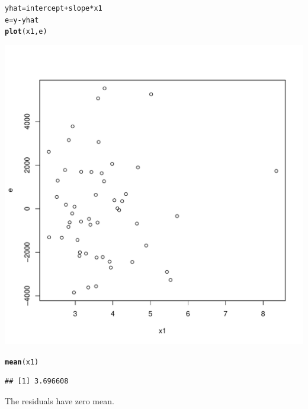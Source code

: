 \documentclass{article}\usepackage[]{graphicx}\usepackage[]{color}
\makeatletter
\def\maxwidth{ %
  \ifdim\Gin@nat@width>\linewidth
    \linewidth
  \else
    \Gin@nat@width
  \fi
}
\newcommand{\hlopt}[1]{\textcolor[rgb]{0,0,0}{#1}}%
\newcommand{\hlstd}[1]{\textcolor[rgb]{0.345,0.345,0.345}{#1}}%
\newcommand{\hlkwb}[1]{\textcolor[rgb]{0.69,0.353,0.396}{#1}}%
\newcommand{\hlkwd}[1]{\textcolor[rgb]{0.737,0.353,0.396}{\textbf{#1}}}%
\newenvironment{kframe}{%
 \def\at@end@of@kframe{}%
 \ifinner\ifhmode%
  \def\at@end@of@kframe{\end{minipage}}%
  \begin{minipage}{\columnwidth}%
 \fi\fi%
 \def\FrameCommand##1{\hskip\@totalleftmargin \hskip-\fboxsep
 \colorbox{shadecolor}{##1}\hskip-\fboxsep
     \hskip-\linewidth \hskip-\@totalleftmargin \hskip\columnwidth}%
 \MakeFramed {\advance\hsize-\width
   \@totalleftmargin\z@ \linewidth\hsize
   \@setminipage}}%
 {\par\unskip\endMakeFramed%
 \at@end@of@kframe}
\newenvironment{knitrout}{}{} %
\makeatother
\begin{document}
\begin{knitrout}
\color{fgcolor}\begin{kframe}
\begin{alltt}
\hlstd{yhat} \hlkwb{=} \hlstd{intercept} \hlopt{+} \hlstd{slope}\hlopt{*}\hlstd{x1}
\hlstd{e} \hlkwb{=} \hlstd{y} \hlopt{-} \hlstd{yhat}
\hlkwd{plot}\hlstd{(x1,e)}
\end{alltt}
\end{kframe}
\includegraphics[width=\maxwidth]{figure/unnamed-chunk-8-1} 
\begin{kframe}\begin{alltt}
\hlkwd{mean}\hlstd{(x1)}
\end{alltt}
\begin{verbatim}
## [1] 3.696608
\end{verbatim}
\end{kframe}
\end{knitrout}
The residuals have zero mean.
\clearpage
\end{document}
